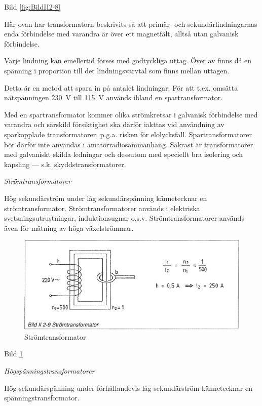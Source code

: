 Bild \ref{fig:BildII2-8}

Här ovan har transformatorn beskrivits så att primär- och sekundärlindningarnas
enda förbindelse med varandra är över ett magnetfält, alltså utan galvanisk
förbindelse.

Varje lindning kan emellertid förses med godtyckliga uttag. Över av finns då en
spänning i proportion till det lindningsvarvtal som finns mellan uttagen.

Detta är en metod att spara in på antalet lindningar. För att t.ex. omsätta
nätspänningen 230~V till 115~V används ibland en spartransformator.

Med en spartransformator kommer olika strömkretsar i galvanisk förbindelse med
varandra och särskild försiktighet ska därför iakttas vid användning av
sparkopplade transformatorer, p.g.a. risken för elolycksfall.
Spartransformatorer bör därför inte användas i amatörradiosammanhang. Säkrast
är transformatorer med galvaniskt skilda ledningar och dessutom med speciellt
bra isolering och kapsling --- s.k. skyddstransformatorer.

\emph{Strömtransformatorer}

Hög sekundärström under låg sekundärspänning kännetecknar en strömtransformator.
Strömtransformatorer används i elektriska svetsningsutrustningar,
induktionsugnar o.s.v. Strömtransformatorer används även för mätning av höga
växelströmmar.

\begin{figure}[h]
\begin{center}
\includegraphics[width=\textwidth]{images/bild_2_2-09}
\caption{Strömtransformator}
\label{fig:BildII2-9}
\end{center}
\end{figure}

Bild \ref{fig:BildII2-9}

\emph{Högspänningstransformatorer}

Hög sekundärspänning under förhållandevis låg sekundärström kännetecknar en
spänningstransformator.

